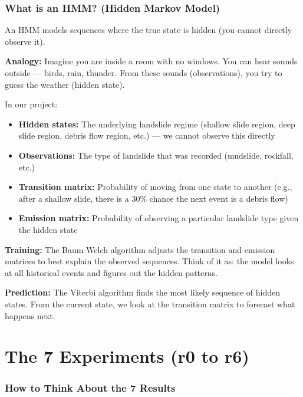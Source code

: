 \documentclass[11pt]{article}
\begin{document}
\section{What is an HMM? (Hidden Markov Model)}

An HMM models sequences where the true state is hidden (you cannot directly observe it).

\textbf{Analogy:} Imagine you are inside a room with no windows. You can hear sounds outside --- birds, rain, thunder. From these sounds (observations), you try to guess the weather (hidden state).

In our project:
\begin{itemize}[noitemsep]
    \item \textbf{Hidden states:} The underlying landslide regime (shallow slide region, deep slide region, debris flow region, etc.) --- we cannot observe this directly
    \item \textbf{Observations:} The type of landslide that was recorded (mudslide, rockfall, etc.)
    \item \textbf{Transition matrix:} Probability of moving from one state to another (e.g., after a shallow slide, there is a 30\% chance the next event is a debris flow)
    \item \textbf{Emission matrix:} Probability of observing a particular landslide type given the hidden state
\end{itemize}

\textbf{Training:} The Baum-Welch algorithm adjusts the transition and emission matrices to best explain the observed sequences. Think of it as: the model looks at all historical events and figures out the hidden patterns.

\textbf{Prediction:} The Viterbi algorithm finds the most likely sequence of hidden states. From the current state, we look at the transition matrix to forecast what happens next.

\part{The 7 Experiments (r0 to r6)}

\section{How to Think About the 7 Results}
\end{document}
